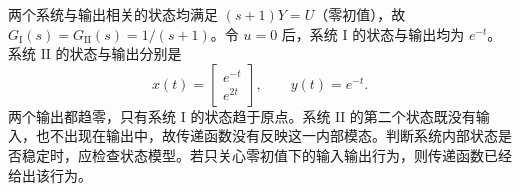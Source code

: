

\sol 两个系统与输出相关的状态均满足 $(s+1)Y=U$（零初值），故 $G_{\mathrm I}(s)=G_{\mathrm {II}}(s)=1/(s+1)$。令 $u=0$ 后，系统 $\mathrm I$ 的状态与输出均为 $e^{-t}$。系统 $\mathrm {II}$ 的状态与输出分别是
\[
    x(t)=\begin{bmatrix}e^{-t}\\e^{2t}\end{bmatrix},\qquad y(t)=e^{-t}.
\]
两个输出都趋零，只有系统 $\mathrm I$ 的状态趋于原点。系统 $\mathrm {II}$ 的第二个状态既没有输入，也不出现在输出中，故传递函数没有反映这一内部模态。判断系统内部状态是否稳定时，应检查状态模型。若只关心零初值下的输入输出行为，则传递函数已经给出该行为。
